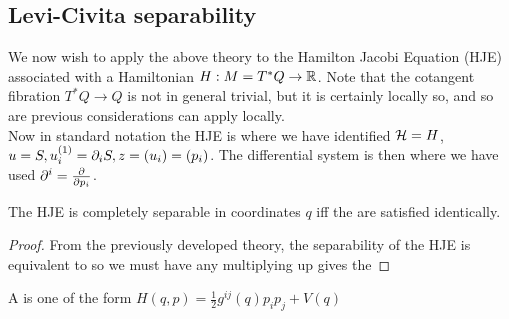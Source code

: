 \documentclass{article}
\begin{document}
\subsection{Levi-Civita separability}
We now wish to apply the above theory to the Hamilton Jacobi Equation (HJE) associated with a Hamiltonian $H : M= T^\ast Q \to \mathbb{R}$. Note that the cotangent fibration $T^\ast Q \to Q$ is not in general trivial, but it is certainly locally so, and so are previous considerations can apply locally. \\
Now in standard notation the HJE is 
where we have identified $\mathcal{H}=H$, $u=S, u_i^{(1)} = \partial_i S, z = (u_i) = (p_i)$. The differential system is then 
where we have used $\partial^i = \frac{\partial}{\partial p_i}$. 
\begin{theorem}
The HJE is completely separable in coordinates $q$ iff the 
are satisfied identically.
\end{theorem}
\begin{proof}
From the previously developed theory, the separability of the HJE is equivalent to 
so we must have 
any multiplying up gives the 
\end{proof}

\begin{definition}
A  is one of the form $H(q,p) = \frac{1}{2}g^{ij}(q)p_i p_j + V(q)$
\end{definition}
\end{document}
